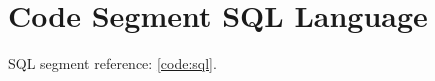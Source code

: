 \documentclass[a4paper,12pt]{report}
\begin{document}
\chapter{Code Segment SQL Language}
SQL segment reference: \ref{code:sql}.
\end{document}
